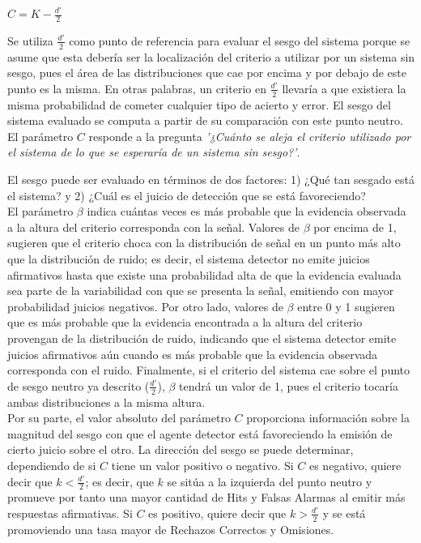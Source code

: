 \begin{itemize}
\begin{itemize}
\begin{center}
$C =  K - \frac{d'}{2}$ \\
\end{center}

Se utiliza $\frac{d'}{2}$ como punto de referencia para evaluar el sesgo del sistema porque se asume que esta debería ser la localización del criterio a utilizar por un sistema sin sesgo, pues el área de las distribuciones que cae por encima y por debajo de este punto es la misma. En otras palabras, un criterio en $\frac{d'}{2}$ llevaría a que existiera la misma probabilidad de cometer cualquier tipo de acierto y error. El sesgo del sistema evaluado se computa a partir de su comparación con este punto neutro.\\

El parámetro $C$ responde a la pregunta \textit{'¿Cuánto se aleja el criterio utilizado por el sistema de lo que se esperaría de un sistema sin sesgo?'}.\\

\end{itemize}

El sesgo puede ser evaluado en términos de dos factores: 1) ¿Qué tan sesgado está el sistema? y 2) ¿Cuál es el juicio de detección que se está favoreciendo?\\

El parámetro $\beta$ indica cuántas veces es más probable que la evidencia observada a la altura del criterio corresponda con la señal. Valores de $\beta$ por encima de 1, sugieren que el criterio choca con la distribución de señal en un punto más alto que la distribución de ruido; es decir, el sistema detector no emite juicios afirmativos hasta que existe una probabilidad alta de que la evidencia evaluada sea parte de la variabilidad con que se presenta la señal, emitiendo con mayor probabilidad juicios negativos. Por otro lado, valores de $\beta$ entre 0 y 1 sugieren que es más probable que la evidencia encontrada a la altura del criterio provengan de la distribución de ruido, indicando que el sistema detector emite juicios afirmativos aún cuando es más probable que la evidencia observada corresponda con el ruido. Finalmente, si el criterio del sistema cae sobre el punto de sesgo neutro ya descrito ($\frac{d'}{2}$), $\beta$ tendrá un valor de 1, pues el criterio tocaría ambas distribuciones a la misma altura.\\

Por su parte, el valor absoluto del parámetro $C$ proporciona información sobre la magnitud del sesgo con que el agente detector está favoreciendo la emisión de cierto juicio sobre el otro. La dirección del sesgo se puede determinar, dependiendo de si $C$ tiene un valor positivo o negativo. Si $C$ es negativo, quiere decir que $k < \frac{d'}{2}$; es decir, que $k$ se sitúa a la izquierda del punto neutro y promueve por tanto una mayor cantidad de Hits y Falsas Alarmas al emitir más respuestas afirmativas. Si $C$ es positivo, quiere decir que $k > \frac{d'}{2}$ y se está promoviendo una tasa mayor de Rechazos Correctos y Omisiones.\\


\end{itemize}

